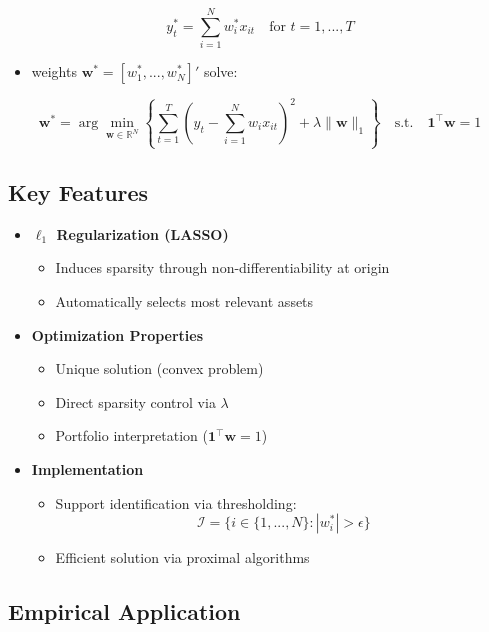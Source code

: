 \documentclass[
  letterpaper,
  DIV=11,
  numbers=noendperiod]{scrartcl}
\providecommand{\tightlist}{%
  \setlength{\itemsep}{0pt}\setlength{\parskip}{0pt}}\usepackage{longtable,booktabs,array}
\begin{document}
\[
y_t^* = \sum_{i=1}^N w_i^* x_{it} \quad \text{for } t=1,...,T
\]

\begin{itemize}
\tightlist
\item
  weights \(\mathbf{w}^*=[w_1^*, ..., w_N^*]'\) solve:
\end{itemize}

\[
\mathbf{w}^* = \arg\min_{\mathbf{w} \in \mathbb{R}^N} \left\{\sum_{t=1}^T \left(y_t - \sum_{i=1}^N w_i x_{it}\right)^2 + \lambda\|\mathbf{w}\|_1\right\} 
\quad \text{s.t.} \quad \mathbf{1}^\top \mathbf{w} = 1
\]

\subsection{Key Features}\label{key-features}

\begin{itemize}
\tightlist
\item
  \textbf{\(\ell_1\) Regularization (LASSO)}

  \begin{itemize}
  \tightlist
  \item
    Induces sparsity through non-differentiability at origin
  \item
    Automatically selects most relevant assets
  \end{itemize}
\item
  \textbf{Optimization Properties}

  \begin{itemize}
  \tightlist
  \item
    Unique solution (convex problem)
  \item
    Direct sparsity control via \(\lambda\)
  \item
    Portfolio interpretation (\(\mathbf{1}^\top \mathbf{w} = 1\))
  \end{itemize}
\item
  \textbf{Implementation}

  \begin{itemize}
  \tightlist
  \item
    Support identification via thresholding: \[
    \mathcal{I} = \{i \in \{1,...,N\} : |w^*_i| > \epsilon\}
    \]
  \item
    Efficient solution via proximal algorithms
  \end{itemize}
\end{itemize}

\subsection{Empirical Application}\label{empirical-application}
\end{document}
